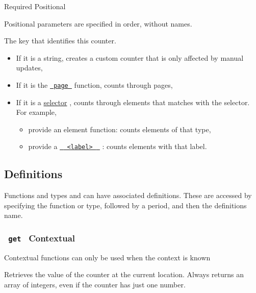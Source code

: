 {Required} {{ Positional }}

\label{constructor-key-positional-tooltip}
Positional parameters are specified in order, without names.

The key that identifies this counter.

\begin{itemize}
\tightlist
\item
  If it is a string, creates a custom counter that is only affected by
  manual updates,
\item
  If it is the \href{/docs/reference/layout/page/}{\texttt{\ page\ }}
  function, counts through pages,
\item
  If it is a \href{/docs/reference/foundations/selector/}{selector} ,
  counts through elements that matches with the selector. For example,

  \begin{itemize}
  \tightlist
  \item
    provide an element function: counts elements of that type,
  \item
    provide a
    \href{/docs/reference/foundations/label/}{\texttt{\ }{\texttt{\ \textless{}label\textgreater{}\ }}\texttt{\ }}
    : counts elements with that label.
  \end{itemize}
\end{itemize}

\subsection{\texorpdfstring{{ Definitions
}}{ Definitions }}\label{definitions}

\label{definitions-tooltip}
Functions and types and can have associated definitions. These are
accessed by specifying the function or type, followed by a period, and
then the definition\textquotesingle s name.

\subsubsection{\texorpdfstring{\texttt{\ get\ } {{ Contextual
}}}{ get   Contextual }}\label{definitions-get}

\label{definitions-get-contextual-tooltip}
Contextual functions can only be used when the context is known

Retrieves the value of the counter at the current location. Always
returns an array of integers, even if the counter has just one number.

